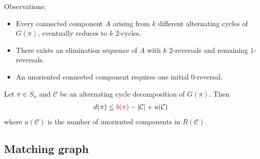 \documentclass[handout]{beamer}
\theoremstyle{definition}
\def\spadding{\vspace{0.25cm}}
\def\r{\textcolor{red}}
\begin{document}

\begin{frame}



Observations:
\begin{itemize}
    \item Every connected component $A$ arising from $k$ different alternating cycles of $G(\pi)$, eventually reduces to $k$ $2$-cycles.\pause
    \item There exists an elimination sequence of $A$ with $k$ $2$-reversals and remaining $1$-reversals.\pause
    \item An unoriented connected component requires one initial $0$-reversal.
\end{itemize}\spadding\pause

\begin{theorem}
\label{thm:4}
Let $\pi \in S_n$ and $\mathcal{C}$ be an alternating cycle decomposition of $G(\pi)$. Then
\begin{align*}
    d(\pi) \leq \r{b(\pi)} - |\mathcal{C}| + u(\mathcal{C})
\end{align*}
where $u(\mathcal{C})$ is the number of unoriented components in $R(\mathcal{C})$.
\end{theorem}

\end{frame}

\subsection{Matching graph}
\end{document}
